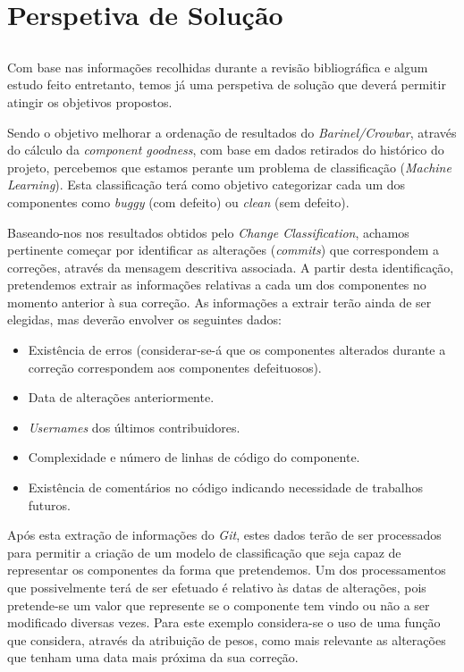 \chapter{Perspetiva de Solução}\label{chap:chap3}

\section*{}

Com base nas informações recolhidas durante a revisão bibliográfica e algum estudo feito entretanto, temos já uma perspetiva de solução que deverá permitir atingir os objetivos propostos.

Sendo o objetivo melhorar a ordenação de resultados do \emph{Barinel/Crowbar}, através do cálculo da \emph{component goodness}, com base em dados retirados do histórico do projeto, percebemos que estamos perante um problema de classificação (\emph{Machine Learning}). 
Esta classificação terá como objetivo categorizar cada um dos componentes como \emph{buggy} (com defeito) ou \emph{clean} (sem defeito).

Baseando-nos nos resultados obtidos pelo \emph{Change Classification}, achamos pertinente começar por identificar as alterações (\emph{commits}) que correspondem a correções, através da mensagem descritiva associada.
A partir desta identificação, pretendemos extrair as informações relativas a cada um dos componentes no momento anterior à sua correção. As informações a extrair terão ainda de ser elegidas, mas deverão envolver os seguintes dados:
%
\begin{itemize}
	\item Existência de erros (considerar-se-á que os componentes alterados durante a correção correspondem aos componentes defeituosos).
	\item Data de alterações anteriormente.
	\item \emph{Usernames} dos últimos contribuidores.
	\item Complexidade e número de linhas de código do componente.
	\item Existência de comentários no código indicando necessidade de trabalhos futuros.
\end{itemize}

Após esta extração de informações do \emph{Git}, estes dados terão de ser processados para permitir a criação de um modelo de classificação que seja capaz de representar os componentes da forma que pretendemos. Um dos processamentos que possivelmente terá de ser efetuado é relativo às datas de alterações, pois pretende-se um valor que represente se o componente tem vindo ou não a ser modificado diversas vezes. Para este exemplo considera-se o uso de uma função que considera, através da atribuição de pesos, como mais relevante as alterações que tenham uma data mais próxima da sua correção.


